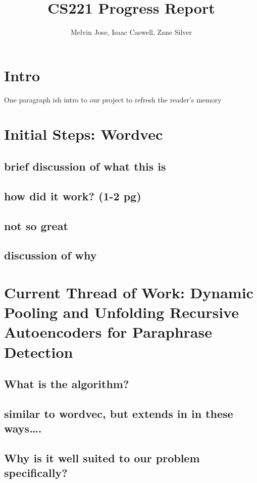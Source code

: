 \documentclass[11pt]{article} %
\title{CS221 Progress Report}
\author{Melvin Jose, Isaac Caswell, Zane Silver}
\begin{document}
\maketitle




\section{Intro}

 One paragraph ish intro to our project to refresh the reader’s memory


\section{Initial Steps: Wordvec}

\subsection{brief discussion of what this is}
\subsection{how did it work? (1-2 pg)}
\subsection{not so great}
\subsection{discussion of why}


\section{Current Thread of Work:  Dynamic Pooling and Unfolding Recursive Autoencoders for Paraphrase Detection}

\subsection{What is the algorithm?}
\subsection{similar to wordvec, but extends in in these ways….}
\subsection{Why is it well suited to our problem specifically?}
\end{document}
